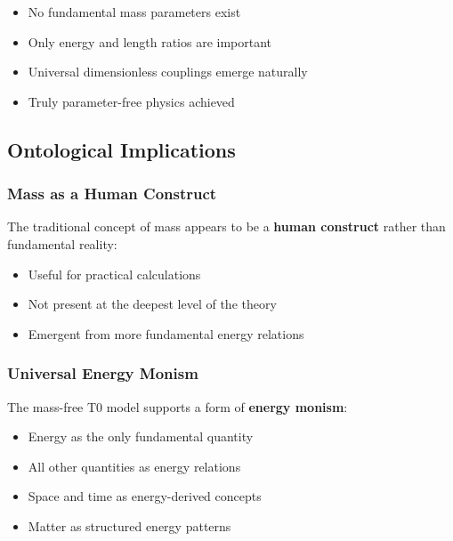 	\begin{itemize}
		\item No fundamental mass parameters exist
		\item Only energy and length ratios are important
		\item Universal dimensionless couplings emerge naturally
		\item Truly parameter-free physics achieved
	\end{itemize}
	
	\subsection{Ontological Implications}
	\label{subsec:ontological}
	
	\subsubsection{Mass as a Human Construct}
	
	The traditional concept of mass appears to be a \textbf{human construct} rather than fundamental reality:
	
	\begin{itemize}
		\item Useful for practical calculations
		\item Not present at the deepest level of the theory
		\item Emergent from more fundamental energy relations
	\end{itemize}
	
	\subsubsection{Universal Energy Monism}
	
	The mass-free T0 model supports a form of \textbf{energy monism}:
	\begin{itemize}
		\item Energy as the only fundamental quantity
		\item All other quantities as energy relations
		\item Space and time as energy-derived concepts
		\item Matter as structured energy patterns
	\end{itemize}
